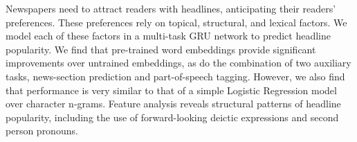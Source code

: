 Newspapers need to attract readers with headlines, anticipating their readers' preferences. These preferences rely on topical, structural, and lexical factors. We model each of these factors in a multi-task GRU network to predict headline popularity. We find that pre-trained word embeddings provide significant improvements over untrained embeddings, as do the combination of two auxiliary tasks, news-section prediction and part-of-speech tagging. However, we also find that performance is very similar to that of a simple Logistic Regression model over character n-grams. Feature analysis reveals structural patterns of headline popularity, including the use of forward-looking deictic expressions and second person pronouns.
